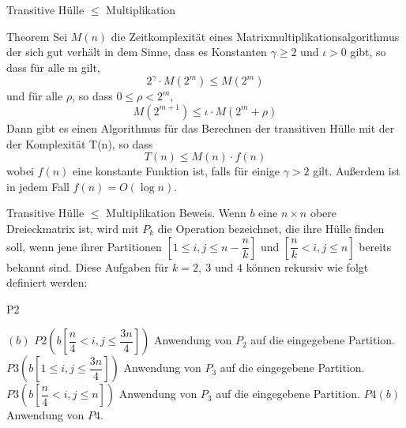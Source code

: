 \documentclass{beamer}
\begin{document}
	\begin{frame}{Transitive Hülle $\le$ Multiplikation}
		\begin{block} {Theorem}
				Sei $M(n)$ die Zeitkomplexität eines Matrixmultiplikationsalgorithmus
			der sich gut verhält in dem Sinne, dass es Konstanten $\gamma  \ge 2$ und $\iota   > 0$ gibt, so dass für alle m gilt,
			$$2^\gamma \cdot M(2^m) \le M(2^m)$$
			und für alle $\rho$, so dass $0 \le \rho < 2^m$,
			$$M(2^{m+1}) \le \iota \cdot M(2^m + \rho)$$
			Dann gibt es einen Algorithmus für das Berechnen der transitiven Hülle mit der der Komplexität T(n), so dass
			$$T(n) \le M(n) \cdot f(n)$$
			wobei $f(n)$ eine konstante Funktion ist, falls für einige $\gamma  > 2$ gilt. Außerdem ist in jedem Fall $f(n) = O(\log n)$. 
		\end{block}
	\end{frame}

	\begin{frame}{Transitive Hülle $\le$ Multiplikation}
		Beweis. Wenn $b$ eine $n \times n$ obere Dreieckmatrix ist, wird mit $P_k$ die Operation
		bezeichnet, die ihre Hülle finden soll, wenn jene ihrer Partitionen $[1 \le i, j \le n - \dfrac{n}{k}]$ und $[\dfrac{n}{k} < i, j \le n]$ bereits bekannt sind. Diese Aufgaben für $k = 2,\ 3$ und $4$ können rekursiv
		wie folgt definiert werden:
		\begin{algorithm}[H]
			\caption[P2]{P2}
			\label{algorithm14}
			\begin{algorithmic}[1]
				\Require $(b)$
				\State $P2(b[\dfrac{n}{4} < i, j\le \dfrac{3n}{4}])$ Anwendung von $P_2$ auf die eingegebene Partition.
				\State $P3(b[1 \le i, j\le \dfrac{3n}{4}])$ Anwendung von $P_3$ auf die eingegebene Partition.
				\State $P3(b[\dfrac{n}{4} < i, j\le n])$ Anwendung von $P_3$ auf die eingegebene Partition.
				\State $P4(b)$ Anwendung von $P4$.
			\end{algorithmic}
		\end{algorithm} 
	\end{frame}
\end{document}

